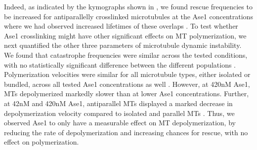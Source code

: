 Indeed, as indicated by the kymographs shown in , we found rescue frequencies to be increased for antiparallelly crosslinked microtubules at the Ase1 concentrations where we had observed increased lifetimes of these overlaps . To test whether Ase1 crosslinking might have other significant effects on MT polymerization, we next quantified the other three parameters of microtubule dynamic instability. We found that catastrophe frequencies were similar across the tested conditions, with no statistically significant difference between the different populations . Polymerization velocities were similar for all microtubule types, either isolated or bundled, across all tested Ase1 concentrations as well . However, at 420nM Ase1, MTs depolymerized markedly slower than at lower Ase1 concentrations. Further, at 42nM and 420nM Ase1, antiparallel MTs displayed a marked decrease in depolymerization velocity compared to isolated and parallel MTs . Thus, we observed Ase1 to only have a measurable effect on MT depolymerization, by reducing the rate of depolymerization and increasing chances for rescue, with no effect on polymerization.\par

